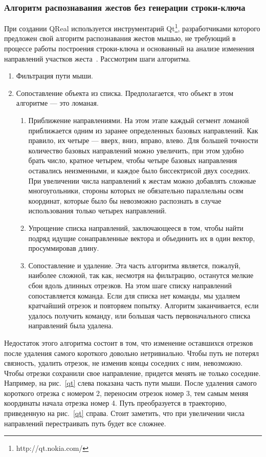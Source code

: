 \documentclass[a5paper]{article}
\begin{document}
\subsubsection{Алгоритм распознавания жестов без генерации строки-ключа}
\label{qtAlgorithm}
При создании QReal используется инструментарий Qt\footnote{http://qt.nokia.com/}, разработчиками которого предложен свой алгоритм распознавания жестов мышью,
не требующий в процессе работы построения строки-ключа и основанный на анализе изменения направлений участков жеста~\cite{qtGestures}. Рассмотрим шаги алгоритма.
\begin{enumerate}
  \item Фильтрация пути мыши.
  \item Сопоставление объекта из списка. Предполагается, что объект в этом алгоритме --- это ломаная.
  \begin{enumerate}
    \item Приближение направлениями. На этом этапе каждый сегмент ломаной приближается одним из заранее определенных базовых направлений. 
Как правило, их четыре --- вверх, вниз, вправо, влево. Для большей точности количество базовых направлений можно увеличить, при этом удобно 
брать число, кратное четырем, чтобы четыре базовых направления оставались неизменными, и каждое было биссектрисой двух соседних. При увеличении числа 
направлений к жестам можно добавлять сложные многоугольники, стороны которых не обязательно параллельны осям координат, которые было бы 
невозможно распознать в случае использования только четырех направлений.
    \item Упрощение списка направлений, заключающееся в том, чтобы найти подряд идущие сонаправленные вектора и объединить их в 
один вектор, просуммировав длину.
    \item Сопоставление и удаление. Эта часть алгоритма является, пожалуй, наиболее сложной, так как, несмотря на фильтрацию, останутся 
мелкие сбои вдоль длинных отрезков. На этом шаге списку направлений сопоставляется команда. Если для списка нет команды, мы удаляем 
кратчайший отрезок и повторяем попытку. Алгоритм заканчивается, если удалось получить команду, или большая часть первоначального списка 
направлений была удалена.
  \end{enumerate}
\end{enumerate}

Недостаток этого алгоритма состоит в том, что изменение оставшихся отрезков после удаления самого короткого довольно нетривиально. 
Чтобы путь не потерял связность, удалить отрезок, не изменив концы соседних с ним, невозможно. Чтобы отрезки сохранили свое направление, 
придется менять не только соседние. Например, на рис.~\ref{qt} слева показана часть пути мыши. После удаления самого короткого отрезка с номером 2, 
переносим отрезок номер 3, тем самым меняя координаты начала отрезка номер 4. Путь преобразуется в траекторию, приведенную на рис.~\ref{qt} справа.
Стоит заметить, что при увеличении числа направлений перестраивать путь будет все сложнее. 
\end{document}
